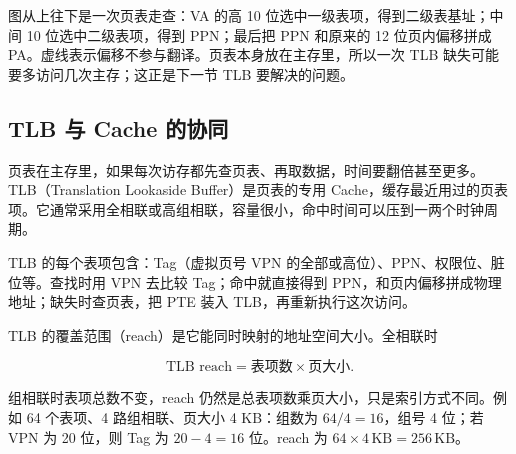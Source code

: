 图从上往下是一次页表走查：VA 的高 10 位选中一级表项，得到二级表基址；中间 10 位选中二级表项，得到 PPN；最后把 PPN 和原来的 12 位页内偏移拼成 PA。虚线表示偏移不参与翻译。页表本身放在主存里，所以一次 TLB 缺失可能要多访问几次主存；这正是下一节 TLB 要解决的问题。

\subsection{TLB 与 Cache 的协同}

页表在主存里，如果每次访存都先查页表、再取数据，时间要翻倍甚至更多。TLB（Translation Lookaside Buffer）是页表的专用 Cache，缓存最近用过的页表项。它通常采用全相联或高组相联，容量很小，命中时间可以压到一两个时钟周期。

TLB 的每个表项包含：Tag（虚拟页号 VPN 的全部或高位）、PPN、权限位、脏位等。查找时用 VPN 去比较 Tag；命中就直接得到 PPN，和页内偏移拼成物理地址；缺失时查页表，把 PTE 装入 TLB，再重新执行这次访问。

TLB 的覆盖范围（reach）是它能同时映射的地址空间大小。全相联时

\[
\text{TLB reach}=\text{表项数}\times\text{页大小}.
\]

组相联时表项总数不变，reach 仍然是总表项数乘页大小，只是索引方式不同。例如 64 个表项、4 路组相联、页大小 4 KB：组数为 \(64/4=16\)，组号 4 位；若 VPN 为 20 位，则 Tag 为 \(20-4=16\) 位。reach 为 \(64\times4\,\mathrm{KB}=256\,\mathrm{KB}\)。

